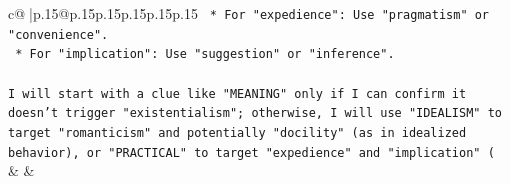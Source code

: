 \documentclass{article}
\begin{document}
{\begin{supertabular}{c@{$\;$}|p{.15\linewidth}@{}p{.15\linewidth}p{.15\linewidth}p{.15\linewidth}p{.15\linewidth}p{.15\linewidth}}
{{{\texttt{    *   For "expedience": Use "pragmatism" or "convenience".} \\
\texttt{    *   For "implication": Use "suggestion" or "inference".} \\
\\ 
\texttt{I will start with a clue like "MEANING" only if I can confirm it doesn't trigger "existentialism"; otherwise, I will use "IDEALISM" to target "romanticism" and potentially "docility" (as in idealized behavior), or "PRACTICAL" to target "expedience" and "implication" (} \\
            }
        }
    }
    & & \\ \\

\end{supertabular}
}
\end{document}
